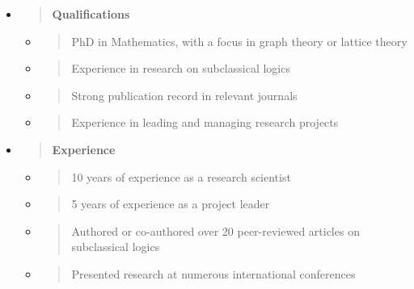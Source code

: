 \begin{itemize}
\item
  \begin{quote}
  \textbf{Qualifications\\
  }
  \end{quote}

  \begin{itemize}
  \item
    \begin{quote}
    PhD in Mathematics, with a focus in graph theory or lattice theory
    \end{quote}
  \item
    \begin{quote}
    Experience in research on subclassical logics
    \end{quote}
  \item
    \begin{quote}
    Strong publication record in relevant journals
    \end{quote}
  \item
    \begin{quote}
    Experience in leading and managing research projects
    \end{quote}
  \end{itemize}
\item
  \begin{quote}
  \textbf{Experience\\
  }
  \end{quote}

  \begin{itemize}
  \item
    \begin{quote}
    10 years of experience as a research scientist
    \end{quote}
  \item
    \begin{quote}
    5 years of experience as a project leader
    \end{quote}
  \item
    \begin{quote}
    Authored or co-authored over 20 peer-reviewed articles on
    subclassical logics
    \end{quote}
  \item
    \begin{quote}
    Presented research at numerous international conferences
    \end{quote}
  \end{itemize}
\end{itemize}

